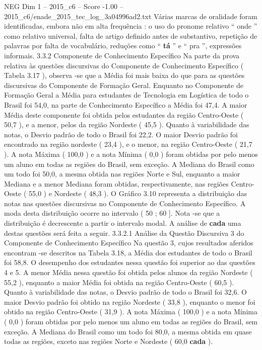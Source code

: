 \begin{textsample}{NEG Dim 1 – 2015\_c6 – Score -1.00 – 2015\_c6/enade\_2015\_tec\_log\_3a04996ad2.txt}
Várias marcas de oralidade foram identificadas, embora não em alta frequência : o uso do pronome relativo “ onde ” como relativo universal, falta de artigo definido antes de substantivo, repetição de palavras por falta de vocabulário, reduções como “ \textbf{tá} ” e “ pra ”, expressões informais. 3.3.2 Componente de Conhecimento Específico Na parte da prova relativa às questões discursivas do Componente de Conhecimento Específico ( Tabela 3.17 ), observa -se que a Média foi mais baixa do que para as questões discursivas do Componente de Formação Geral.
Enquanto no Componente de Formação Geral a Média para estudantes de Tecnologia em Logística de todo o Brasil foi 54,0, na parte de Conhecimento Específico a Média foi 47,4.
A maior Média deste componente foi obtida pelos estudantes da região Centro-Oeste ( 50,7 ), e a menor, pelos da região Nordeste ( 45,5 ).
Quanto à variabilidade das notas, o Desvio padrão de todo o Brasil foi 22,2.
O maior Desvio padrão foi encontrado na região nordeste ( 23,4 ), e o menor, na região Centro-Oeste ( 21,7 ).
A nota Máxima ( 100,0 ) e a nota Mínima ( 0,0 ) foram obtidas por pelo menos um aluno em todas as regiões do Brasil, sem exceção.
A Mediana do Brasil como um todo foi 50,0, a mesma obtida nas regiões Norte e Sul, enquanto a maior Mediana e a menor Mediana foram obtidas, respectivamente, nas regiões Centro-Oeste ( 55,0 ) e Nordeste ( 48,3 ).
O Gráfico 3.10 representa a distribuição das notas nas questões discursivas no Componente de Conhecimento Específico.
A moda desta distribuição ocorre no intervalo ( 50 ; 60 ].
Nota -se que a distribuição é decrescente a partir o intervalo modal.
A análise de \textbf{cada} uma destas questões será feita a seguir. 3.3.2.1 Análise da Questão Discursiva 3 do Componente de Conhecimento Específico Na questão 3, cujos resultados aferidos encontram -se descritos na Tabela 3.18, a Média dos estudantes de todo o Brasil foi 58,8.
O desempenho dos estudantes nessa questão foi superior ao das questões 4 e 5.
A menor Média nessa questão foi obtida pelos alunos da região Nordeste ( 55,2 ), enquanto a maior Média foi obtida na região Centro-Oeste ( 60,5 ).
Quanto à variabilidade das notas, o Desvio padrão de todo o Brasil foi 32,6.
O maior Desvio padrão foi obtido na região Nordeste ( 33,8 ), enquanto o menor foi obtido na região Centro-Oeste ( 31,9 ).
A nota Máxima ( 100,0 ) e a nota Mínima ( 0,0 ) foram obtidas por pelo menos um aluno em todas as regiões do Brasil, sem exceção.
A Mediana do Brasil como um todo foi 80,0, a mesma obtida em quase todas as regiões, exceto nas regiões Norte e Nordeste ( 60,0 \textbf{cada} ).

\end{textsample}
